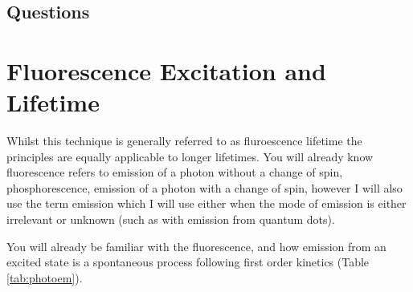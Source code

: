 \documentclass[
]{book}
\begin{document}
\hypertarget{questions}{%
\section{Questions}\label{questions}}

\hypertarget{ch:fluorlif}{%
\chapter{Fluorescence Excitation and Lifetime}\label{ch:fluorlif}}

Whilst this technique is generally referred to as fluroescence lifetime the principles are equally applicable to longer lifetimes. You will already know fluorescence refers to emission of a photon without a change of spin, phosphorescence, emission of a photon with a change of spin, however I will also use the term emission which I will use either when the mode of emission is either irrelevant or unknown (such as with emission from quantum dots).

You will already be familiar with the fluorescence, and how emission from an excited state is a spontaneous process following first order kinetics (Table \ref{tab:photoem}).
\end{document}
